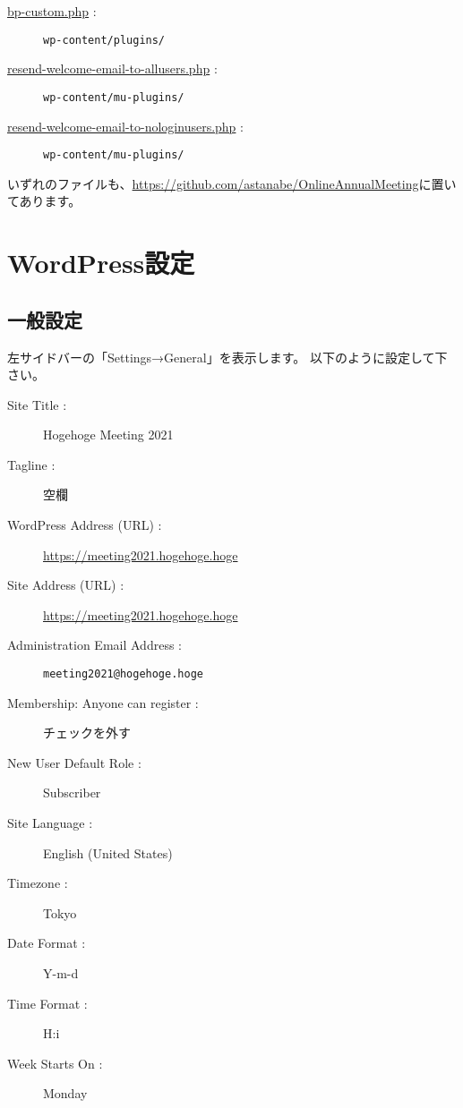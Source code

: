 \documentclass[titlepage,10pt,a4paper,uplatex]{jsbook}
\begin{document}
\begin{description}
\item[\href{https://github.com/astanabe/OnlineAnnualMeeting/blob/main/bp-custom.php}{bp-custom.php} : ] \texttt{wp-content/plugins/}
\item[\href{https://github.com/astanabe/OnlineAnnualMeeting/blob/main/resend-welcome-email-to-allusers.php}{resend-welcome-email-to-allusers.php} : ] \texttt{wp-content/mu-plugins/}
\item[\href{https://github.com/astanabe/OnlineAnnualMeeting/blob/main/resend-welcome-email-to-nologinusers.php}{resend-welcome-email-to-nologinusers.php} : ] \texttt{wp-content/mu-plugins/}
\end{description}

いずれのファイルも、\url{https://github.com/astanabe/OnlineAnnualMeeting}に置いてあります。

\section{WordPress設定}

\subsection{一般設定}

左サイドバーの「Settings→General」を表示します。
以下のように設定して下さい。

\begin{description}
\item[Site Title : ] Hogehoge Meeting 2021
\item[Tagline : ] 空欄
\item[WordPress Address (URL) : ] \url{https://meeting2021.hogehoge.hoge}
\item[Site Address (URL) : ] \url{https://meeting2021.hogehoge.hoge}
\item[Administration Email Address : ] \texttt{meeting2021@hogehoge.hoge}
\item[Membership: Anyone can register : ] チェックを外す
\item[New User Default Role : ] Subscriber
\item[Site Language : ] English (United States)
\item[Timezone : ] Tokyo
\item[Date Format : ] Y-m-d
\item[Time Format : ] H:i
\item[Week Starts On : ] Monday
\end{description}
\end{document}
